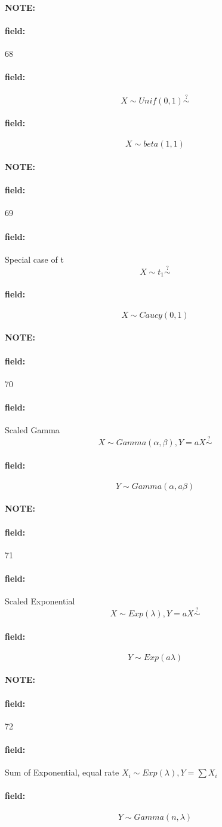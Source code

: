 \documentclass[12pt]{article}
\newenvironment{note}{\paragraph{NOTE:}}{}
\newenvironment{field}{\paragraph{field:}}{}
\begin{document}
\begin{note} \begin{field} \tiny 68 \end{field}
  \begin{field}
    $$ X \sim Unif(0,1) \overset{?}{\sim}$$
  \end{field}
  \begin{field}
    $$ X \sim beta(1,1)$$
  \end{field}
\end{note}

\begin{note} \begin{field} \tiny 69 \end{field}
  \begin{field}
    Special case of t
    $$ X \sim t_1 \overset{?}{\sim}$$
  \end{field}
  \begin{field}
    $$ X \sim Caucy(0,1)$$
  \end{field}
\end{note}


\begin{note} \begin{field} \tiny 70 \end{field}
  \begin{field}
    Scaled Gamma
    $$X \sim Gamma(\alpha,\beta), Y = aX \overset{?}{\sim}$$
  \end{field}
  \begin{field}
    $$ Y \sim Gamma(\alpha,a\beta)$$
  \end{field}
\end{note}

\begin{note} \begin{field} \tiny 71 \end{field}
  \begin{field}
    Scaled Exponential
    $$ X \sim Exp(\lambda), Y = aX \overset{?}{\sim}$$
  \end{field}
  \begin{field}
    $$ Y \sim Exp(a\lambda)$$
  \end{field}
\end{note}

\begin{note} \begin{field} \tiny 72 \end{field}
  \begin{field}
    Sum of Exponential, equal rate
    $X_i \sim Exp(\lambda), Y = \sum X_i$
  \end{field}
  \begin{field}
    $$Y \sim Gamma(n,\lambda)$$
  \end{field}
\end{note}
\end{document}
